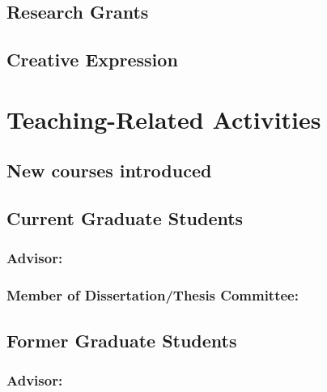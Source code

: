 \documentclass[10pt]{article}
\begin{document}
  \subsection{Research Grants}

\iftrue
  \subsection{Creative Expression}

\fi
%
%    


\iftrue
\section{Teaching-Related Activities}
  \subsection{New courses introduced}

  \subsection{Current Graduate Students}
    \subsubsection{Advisor:}

    \subsubsection{Member of Dissertation/Thesis Committee:}
    \begin{enumerate}

    \end{enumerate}
  \subsection{Former Graduate Students}
    \subsubsection{Advisor:}
    \begin{enumerate}

    \end{enumerate}
\end{document}
